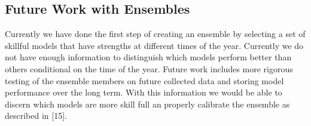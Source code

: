 \subsection{Future Work with Ensembles}
 
Currently we have done the first step of creating an ensemble by selecting a set of skillful models that have strengths at different times of the year. Currently we do not have enough information to distinguish which models perform better than others conditional on the time of the year. Future work includes more rigorous testing of the ensemble members on future collected data and storing model performance over the long term. With this information we would be able to discern which models are more skill full an properly calibrate the ensemble as described in [15]. 


